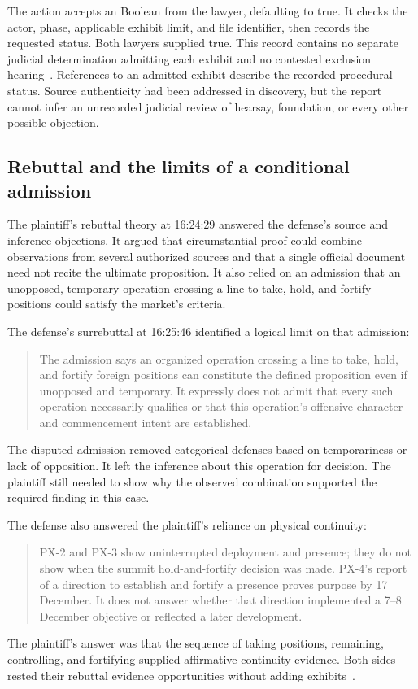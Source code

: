 The  action accepts an  Boolean from the lawyer, defaulting to true.  It checks the actor, phase, applicable exhibit limit, and file identifier, then records the requested status.  Both lawyers supplied true.  This record contains no separate judicial determination admitting each exhibit and no contested exclusion hearing~\cite[]{adccore}.  References to an admitted exhibit describe the recorded procedural status.  Source authenticity had been addressed in discovery, but the report cannot infer an unrecorded judicial review of hearsay, foundation, or every other possible objection.

\subsection{Rebuttal and the limits of a conditional admission}

The plaintiff's rebuttal theory at 16:24:29 answered the defense's source and inference objections.  It argued that circumstantial proof could combine observations from several authorized sources and that a single official document need not recite the ultimate proposition.  It also relied on an admission that an unopposed, temporary operation crossing a line to take, hold, and fortify positions could satisfy the market's criteria.

The defense's surrebuttal at 16:25:46 identified a logical limit on that admission:
\begin{quote}
The admission says an organized operation crossing a line to take, hold, and fortify foreign positions can constitute the defined proposition even if unopposed and temporary.  It expressly does not admit that every such operation necessarily qualifies or that this operation's offensive character and commencement intent are established.
\end{quote}
The disputed admission removed categorical defenses based on temporariness or lack of opposition.  It left the inference about this operation for decision.  The plaintiff still needed to show why the observed combination supported the required finding in this case.

The defense also answered the plaintiff's reliance on physical continuity:
\begin{quote}
PX-2 and PX-3 show uninterrupted deployment and presence; they do not show when the summit hold-and-fortify decision was made.  PX-4's report of a direction to establish and fortify a presence proves purpose by 17 December.  It does not answer whether that direction implemented a 7--8 December objective or reflected a later development.
\end{quote}
The plaintiff's answer was that the sequence of taking positions, remaining, controlling, and fortifying supplied affirmative continuity evidence.  Both sides rested their rebuttal evidence opportunities without adding exhibits~\cite[events 319--325]{record}.

